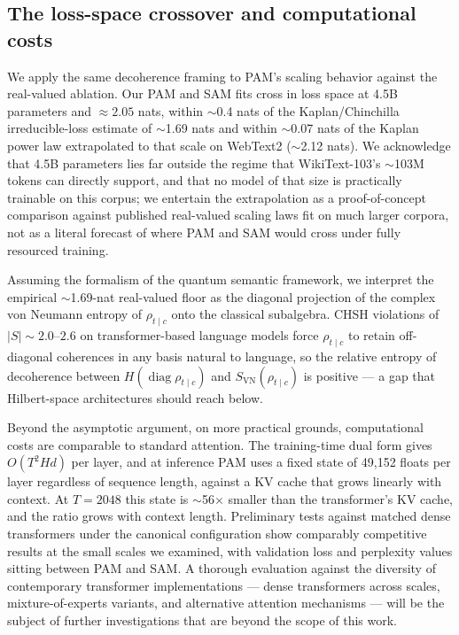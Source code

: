 \documentclass[aps,prl,twocolumn,superscriptaddress,amsmath,amssymb]{revtex4-2}
\begin{document}
\subsection{The loss-space crossover and computational costs}
\label{sec:dis_gap}

We apply the same decoherence framing to PAM's scaling behavior against the real-valued ablation. Our PAM and SAM fits cross in loss space at 4.5B parameters and $\approx 2.05$ nats, within $\sim$0.4 nats of the Kaplan/Chinchilla irreducible-loss estimate of $\sim$1.69 nats and within $\sim$0.07 nats of the Kaplan power law extrapolated to that scale on WebText2 ($\sim$2.12 nats). We acknowledge that 4.5B parameters lies far outside the regime that WikiText-103's $\sim$103M tokens can directly support, and that no model of that size is practically trainable on this corpus; we entertain the extrapolation as a proof-of-concept comparison against published real-valued scaling laws fit on much larger corpora, not as a literal forecast of where PAM and SAM would cross under fully resourced training.

Assuming the formalism of the quantum semantic framework, we interpret the empirical $\sim$1.69-nat real-valued floor as the diagonal projection of the complex von Neumann entropy of $\rho_{t\mid c}$ onto the classical subalgebra. CHSH violations of $|S| \sim 2.0$--$2.6$ on transformer-based language models force $\rho_{t\mid c}$ to retain off-diagonal coherences in any basis natural to language, so the relative entropy of decoherence between $H(\operatorname{diag}\rho_{t\mid c})$ and $S_{\text{VN}}(\rho_{t\mid c})$ is positive --- a gap that Hilbert-space architectures should reach below.

Beyond the asymptotic argument, on more practical grounds, computational costs are comparable to standard attention. The training-time dual form gives $O(T^2 H d)$ per layer, and at inference PAM uses a fixed state of 49,152 floats per layer regardless of sequence length, against a KV cache that grows linearly with context. At $T = 2048$ this state is $\sim$56$\times$ smaller than the transformer's KV cache, and the ratio grows with context length. Preliminary tests against matched dense transformers under the canonical configuration show comparably competitive results at the small scales we examined, with validation loss and perplexity values sitting between PAM and SAM. A thorough evaluation against the diversity of contemporary transformer implementations --- dense transformers across scales, mixture-of-experts variants, and alternative attention mechanisms --- will be the subject of further investigations that are beyond the scope of this work.
\end{document}
